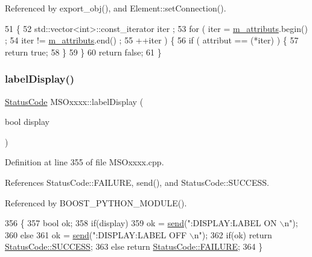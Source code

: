 Referenced by export\+\_\+obj(), and Element\+::set\+Connection().


\begin{DoxyCode}
51   \{
52     std::vector<int>::const\_iterator iter ;
53     \textcolor{keywordflow}{for} ( iter  = \hyperlink{classAttrib_ac4bd58a0cc6b38a3b711d609a3d3aacc}{m\_attributs}.begin() ;
54           iter != \hyperlink{classAttrib_ac4bd58a0cc6b38a3b711d609a3d3aacc}{m\_attributs}.end()   ;
55           ++iter ) \{
56       \textcolor{keywordflow}{if} ( attribut == (*iter) ) \{
57         \textcolor{keywordflow}{return} \textcolor{keyword}{true};
58       \}
59     \}
60     \textcolor{keywordflow}{return} \textcolor{keyword}{false};
61   \}
\end{DoxyCode}
\mbox{\label{classMSOxxxx_ade4192f09f150be8b9c7c081ce1a1870}} 
\subsubsection{\texorpdfstring{label\+Display()}{labelDisplay()}}
{\footnotesize\ttfamily \hyperlink{classStatusCode}{Status\+Code} M\+S\+Oxxxx\+::label\+Display (\begin{DoxyParamCaption}\item[{bool}]{display }\end{DoxyParamCaption})}



Definition at line 355 of file M\+S\+Oxxxx.\+cpp.



References Status\+Code\+::\+F\+A\+I\+L\+U\+RE, send(), and Status\+Code\+::\+S\+U\+C\+C\+E\+SS.



Referenced by B\+O\+O\+S\+T\+\_\+\+P\+Y\+T\+H\+O\+N\+\_\+\+M\+O\+D\+U\+L\+E().


\begin{DoxyCode}
356 \{
357     \textcolor{keywordtype}{bool} ok;
358     \textcolor{keywordflow}{if}(display)     
359         ok = \hyperlink{classMSOxxxx_ae77668a1ae4ccb74e0ed5f2485dfdebf}{send}(\textcolor{stringliteral}{":DISPLAY:LABEL ON \(\backslash\)n"});
360     \textcolor{keywordflow}{else}
361         ok = \hyperlink{classMSOxxxx_ae77668a1ae4ccb74e0ed5f2485dfdebf}{send}(\textcolor{stringliteral}{":DISPLAY:LABEL OFF \(\backslash\)n"});
362     \textcolor{keywordflow}{if}(ok)  \textcolor{keywordflow}{return} \hyperlink{classStatusCode_a6f565cbeadc76d14c72f047e5e85eb4badd0da38d3ba0d922efd1f4619bc37ad8}{StatusCode::SUCCESS};
363     \textcolor{keywordflow}{else}        \textcolor{keywordflow}{return} \hyperlink{classStatusCode_a6f565cbeadc76d14c72f047e5e85eb4ba3da73d4c469762eb9d3c960368252b26}{StatusCode::FAILURE};  
364 \}
\end{DoxyCode}
\mbox{\label{classObject_a58b2d0618c2d08cf2383012611528d97}} 
